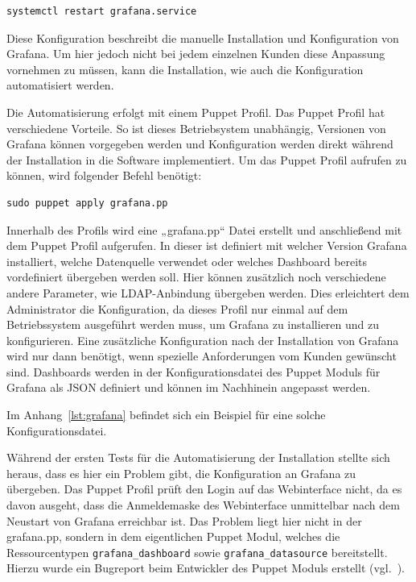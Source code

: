 {\begin{verbatim}
systemctl restart grafana.service
\end{verbatim}

Diese Konfiguration beschreibt die manuelle Installation und Konfiguration von
Grafana. Um hier jedoch nicht bei jedem einzelnen Kunden diese Anpassung
vornehmen zu müssen, kann die Installation, wie auch die Konfiguration
automatisiert werden.

Die Automatisierung erfolgt mit einem Puppet Profil. Das Puppet Profil hat
verschiedene Vorteile. So ist dieses Betriebsystem unabhängig, Versionen von
Grafana können vorgegeben werden und Konfiguration werden direkt während der
Installation in die Software implementiert. Um das Puppet Profil aufrufen zu
können, wird folgender Befehl benötigt:

\begin{verbatim}
sudo puppet apply grafana.pp
\end{verbatim}

Innerhalb des Profils wird eine „grafana.pp“ Datei erstellt und anschließend
mit dem Puppet Profil aufgerufen. In dieser ist definiert mit welcher Version
Grafana installiert, welche Datenquelle verwendet oder welches Dashboard
bereits vordefiniert übergeben werden soll. Hier können zusätzlich noch
verschiedene andere Parameter, wie LDAP\hyp{}Anbindung übergeben werden. Dies
erleichtert dem Administrator die Konfiguration, da dieses Profil nur einmal
auf dem Betriebssystem ausgeführt werden muss, um Grafana zu installieren und
zu konfigurieren. Eine zusätzliche Konfiguration nach der Installation von
Grafana wird nur dann benötigt, wenn spezielle Anforderungen vom Kunden
gewünscht sind. Dashboards werden in der Konfigurationsdatei des Puppet Moduls
für Grafana als \gls{JSON} definiert und können im Nachhinein angepasst werden.

Im Anhang~\ref{lst:grafana} befindet sich ein Beispiel für eine solche
Konfigurationsdatei.

Während der ersten Tests für die Automatisierung der Installation stellte sich
heraus, dass es hier ein Problem gibt, die Konfiguration an Grafana zu
übergeben. Das Puppet Profil prüft den Login auf das Webinterface nicht,
da es davon ausgeht, dass die Anmeldemaske des Webinterface unmittelbar
nach dem Neustart von Grafana erreichbar ist. Das Problem liegt hier nicht in
der grafana.pp, sondern in dem eigentlichen Puppet Modul, welches die
Ressourcentypen \texttt{grafana\_dashboard} sowie \texttt{grafana\_datasource}
bereitstellt. Hierzu wurde ein Bugreport beim Entwickler des Puppet Moduls
erstellt (vgl.~\cite{grafana-issue}).
\mr%

}
